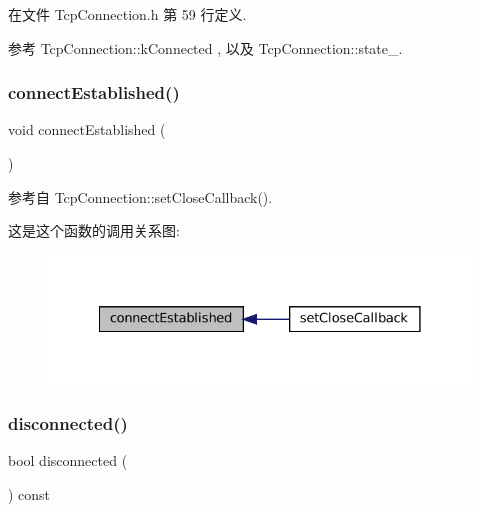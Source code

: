在文件 Tcp\+Connection.\+h 第 59 行定义.



参考 Tcp\+Connection\+::k\+Connected , 以及 Tcp\+Connection\+::state\+\_\+.

\mbox{\label{classmuduo_1_1net_1_1TcpConnection_a2e1f9742dac98a0c3e5a5509920934ae}} 
\subsubsection{\texorpdfstring{connect\+Established()}{connectEstablished()}}
{\footnotesize\ttfamily void connect\+Established (\begin{DoxyParamCaption}{ }\end{DoxyParamCaption})}



参考自 Tcp\+Connection\+::set\+Close\+Callback().

这是这个函数的调用关系图\+:
\nopagebreak
\begin{figure}[H]
\begin{center}
\leavevmode
\includegraphics[width=328pt]{classmuduo_1_1net_1_1TcpConnection_a2e1f9742dac98a0c3e5a5509920934ae_icgraph}
\end{center}
\end{figure}
\mbox{\label{classmuduo_1_1net_1_1TcpConnection_a69413dc574470cdba5981d3e05250f7b}} 
\subsubsection{\texorpdfstring{disconnected()}{disconnected()}}
{\footnotesize\ttfamily bool disconnected (\begin{DoxyParamCaption}{ }\end{DoxyParamCaption}) const\hspace{0.3cm}{\ttfamily [inline]}}




